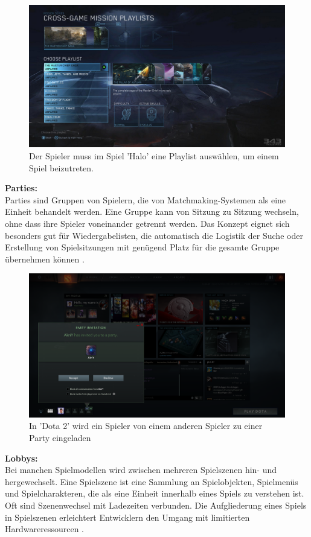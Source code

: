 \begin{figure}[H]
	\centering
	\includegraphics[width=120mm]{images/halo_playlist.png}
	\caption['Halo' Playlist]{Der Spieler muss im Spiel 'Halo' eine Playlist auswählen, um einem Spiel beizutreten.}
	\label{pic:halo_playlist}
\end{figure}

\textbf{Parties:} \\
Parties sind Gruppen von Spielern, die von Matchmaking-Systemen als eine Einheit behandelt werden. Eine Gruppe kann von Sitzung zu Sitzung wechseln, ohne dass ihre Spieler voneinander getrennt werden. Das Konzept eignet sich besonders gut für Wiedergabelisten, die automatisch die Logistik der Suche oder Erstellung von Spielsitzungen mit genügend Platz für die gesamte Gruppe übernehmen können \cite{Wikipedia.2021b}. 

\begin{figure}[H]
	\centering
	\includegraphics[width=120mm]{images/Dota2_Party_Invite.png}
	\caption['Dota 2' Party]{In 'Dota 2' wird ein Spieler von einem anderen Spieler zu einer Party eingeladen}
	\label{pic:Dota2_Party_Invite}
\end{figure}

\textbf{Lobbys:} \\
Bei manchen Spielmodellen wird zwischen mehreren Spielszenen hin- und hergewechselt. Eine Spielszene ist eine Sammlung an Spielobjekten, Spielmenüs und Spielcharakteren, die als eine Einheit innerhalb eines Spiels zu verstehen ist. Oft sind Szenenwechsel mit Ladezeiten verbunden. Die Aufgliederung eines Spiels in Spielszenen erleichtert Entwicklern den Umgang mit limitierten Hardwareressourcen \cite{Wikipedia.2012}. 

